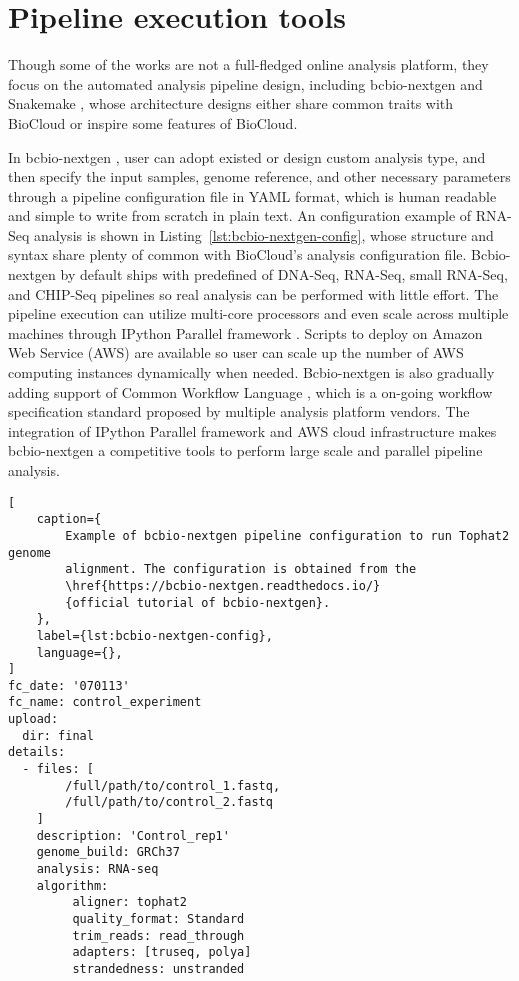 \section{Pipeline execution tools}

Though some of the works are not a full-fledged online analysis platform, they
focus on the automated analysis pipeline design, including bcbio-nextgen
\cite{:bcbionextgen,guimera2012:bcbionextgen} and Snakemake
\cite{koster2012:snakemakea}, whose architecture designs either share common
traits with BioCloud or inspire some features of BioCloud.

In bcbio-nextgen \cite{:bcbionextgen,guimera2012:bcbionextgen}, user can adopt
existed or design custom analysis type, and then specify the input samples,
genome reference, and other necessary parameters through a pipeline
configuration file in YAML format, which is human readable and simple to write
from scratch in plain text. An configuration example of RNA-Seq analysis is
shown in Listing~\ref{lst:bcbio-nextgen-config}, whose structure and syntax
share plenty of common with BioCloud's analysis configuration file.
Bcbio-nextgen by default ships with predefined of DNA-Seq, RNA-Seq, small
RNA-Seq, and CHIP-Seq pipelines so real analysis can be performed with little
effort. The pipeline execution can utilize multi-core processors and even scale
across multiple machines through IPython Parallel framework
\cite{:ipython-parallel}. Scripts to deploy on Amazon Web Service (AWS) are
available so user can scale up the number of AWS computing instances
dynamically when needed. Bcbio-nextgen is also gradually adding support of
Common Workflow Language \cite{amstutz2016:common}, which is a on-going
workflow specification standard proposed by multiple analysis platform vendors.
The integration of IPython Parallel framework and AWS cloud infrastructure
makes bcbio-nextgen a competitive tools to perform large scale and parallel
pipeline analysis.

\begin{lstlisting}[
    caption={
        Example of bcbio-nextgen pipeline configuration to run Tophat2 genome
        alignment. The configuration is obtained from the
        \href{https://bcbio-nextgen.readthedocs.io/}
        {official tutorial of bcbio-nextgen}.
    },
    label={lst:bcbio-nextgen-config},
    language={},
]
fc_date: '070113'
fc_name: control_experiment
upload:
  dir: final
details:
  - files: [
        /full/path/to/control_1.fastq,
        /full/path/to/control_2.fastq
    ]
    description: 'Control_rep1'
    genome_build: GRCh37
    analysis: RNA-seq
    algorithm:
         aligner: tophat2
         quality_format: Standard
         trim_reads: read_through
         adapters: [truseq, polya]
         strandedness: unstranded
\end{lstlisting}

